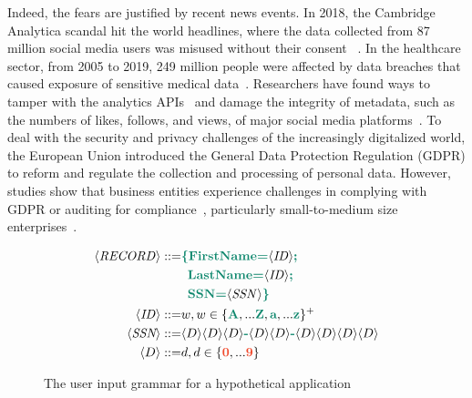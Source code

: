 \documentclass[10pt, letterpaper]{article}
\begin{document}
Indeed, the fears are justified by recent news events. In 2018, the Cambridge
Analytica scandal hit the world headlines, where the data collected from 87
million social media users was misused without their consent
~\citep{cadwalladr2018facebook,kitchgaessner2017cambridge,gonzalez2019global,hinds2020wouldn}.
In the healthcare sector, from 2005 to 2019, 249 million people were
affected by data breaches that caused exposure of sensitive medical
data~\citep{seh2020healthcare}. Researchers have found ways to tamper with the
analytics APIs~\citep{pfeffer2018tampering} and damage the integrity of
metadata, such as the numbers of likes, follows, and views, of major social
media platforms~\citep{paquet2017can}. To deal with the security and privacy
challenges of the increasingly digitalized world, the European Union introduced
the General Data Protection Regulation (GDPR) to reform and regulate the
collection and processing of personal data. However, studies show that business
entities experience challenges in complying with GDPR or auditing for
compliance~\citep{smirnova2024understanding}, particularly small-to-medium
size enterprises~\citep{sirur2018we,freitas2018gdpr,harting2021impacts}.

\begin{figure}[tbp]
  \small
  \begin{align*}
    \langle \mathit{RECORD} \rangle ::= & {\color{green} \textbf{\{FirstName=}} \langle \mathit{ID} \rangle {\color{green} \textbf{;}} \\
                               & \enspace {\color{green} \textbf{LastName=}} \langle \mathit{ID} \rangle {\color{green} \textbf{;}} \\
                               & \enspace {\color{green} \textbf{SSN=}} \langle \mathit{SSN} \rangle {\color{green} \textbf{\}}} \\
    \langle \mathit{ID} \rangle     ::= & w , w \in \{ {\color{green} \textbf{A}}, ... {\color{green} \textbf{Z}}, {\color{green} \textbf{a}}, ... {\color{green} \textbf{z}} \}^{+} \\
    \langle \textit{SSN} \rangle    ::= & \langle D \rangle \langle D \rangle \langle D \rangle {\color{green} \textbf{-}}
                                 \langle D \rangle \langle D \rangle {\color{green} \textbf{-}}
                                 \langle D \rangle \langle D \rangle \langle D \rangle \langle D \rangle \\
    \langle D \rangle      ::= & d , d \in \{ {\color{red} \textbf{0}}, ... {\color{red} \textbf{9}} \}
  \end{align*}
  \caption{The user input grammar for a hypothetical application}
  \label{fig:grammar}
\end{figure}
\end{document}
